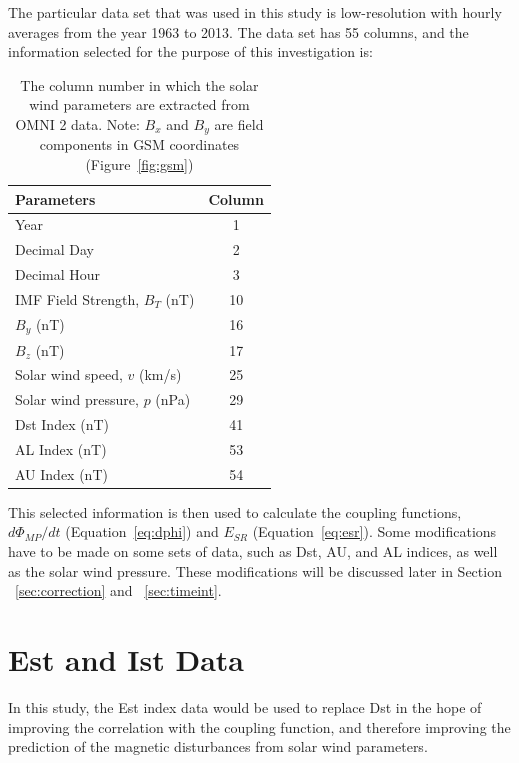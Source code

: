 \documentclass[12pt]{report} %
\begin{document}
The particular data set that was used in this study is low-resolution with hourly averages from the year 1963 to 2013. The data set has 55 columns, and the information selected for the purpose of this investigation is: 
\begin{table}[h]\small
\centering
\renewcommand{\arraystretch}{1.1}
\begin{tabular}{ l  c}
\hline
  Parameters &Column  \\ \hline
 Year & 1 \\
Decimal Day & 2\\
Decimal Hour & 3 \\
IMF Field Strength, $B_T$ (nT) &10 \\
$B_y$ (nT) & 16 \\
$B_z$ (nT) & 17 \\
Solar wind speed, $v$ (km/s) & 25 \\
Solar wind pressure, $p$ (nPa) & 29 \\
Dst Index (nT) & 41 \\
AL Index (nT) & 53 \\
AU Index (nT) & 54 \\
\hline
\end{tabular}\caption{The column number in which the solar wind parameters are extracted from OMNI 2 data. Note: $B_x$ and $B_y$ are field components in GSM coordinates (Figure~\ref{fig:gsm})} \label{tab:column}
\end{table}

\vspace{-5pt}
\noindent This selected information is then used to calculate the coupling functions, $d\Phi_{MP}/dt$ (Equation~\ref{eq:dphi}) and $E_{SR}$ (Equation~\ref{eq:esr}). Some modifications have to be made on some sets of data, such as Dst, AU, and AL indices, as well as the solar wind pressure. These modifications will be discussed later in Section ~\ref{sec:correction} and ~\ref{sec:timeint}. \par

\vspace{0pt}
\section{Est and Ist Data} \label{sec:est}

In this study, the Est index data would be used to replace Dst in the hope of improving the correlation with the coupling function, and therefore improving the prediction of the magnetic disturbances from solar wind parameters. 
\end{document}
